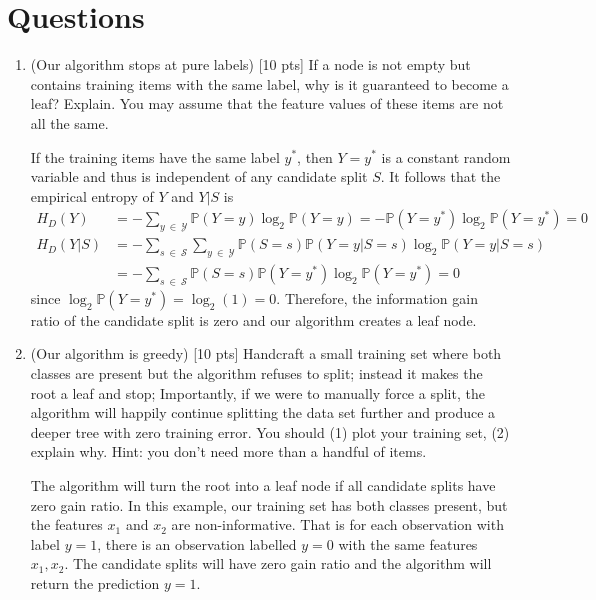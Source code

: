 \documentclass[a4paper]{article}
\theoremstyle{definition}
\newenvironment{soln}{
    \leavevmode\color{blue}\ignorespaces
}{}
\begin{document}
\section{Questions}
\begin{enumerate}
\item (Our algorithm stops at pure labels) [10 pts] If a node is not empty but contains training items with the same label, why is it guaranteed to become a leaf?  Explain. You may assume that the feature values of these items are not all the same. \\

\begin{soln}
  If the training items have the same label $y^*$, then $Y = y^*$ is a constant random variable and thus is independent of any candidate split $S$. It follows that the empirical entropy of $Y$ and $Y|S$ is 
  $$\begin{aligned}
  H_D(Y) &= -\sum_{y \:\in\: \mathcal{Y}}\mathbb{P}(Y=y)\log_2\mathbb{P}(Y=y) = -\mathbb{P}(Y = y^*)\log_2\mathbb{P}(Y=y^*)=0 \\[1ex]
  H_D(Y|S) &= -\sum_{s\:\in\:\mathcal{S}} \sum_{y \:\in\:\mathcal{Y}} \mathbb{P}(S=s)\mathbb{P}(Y=y|S=s)\log_2\mathbb{P}(Y=y|S=s)\\[1ex]
  &=-\sum_{s\:\in\:\mathcal{S}}\mathbb{P}(S=s)\mathbb{P}(Y=y^*)\log_2\mathbb{P}(Y=y^*) = 0
  \end{aligned}$$ since $\log_2\mathbb{P}(Y=y^*)=\log_2(1)=0$. Therefore, the information gain ratio of the candidate split is zero and our algorithm creates a leaf node.
\end{soln}

\item (Our algorithm is greedy)  [10 pts] Handcraft a small training set where both classes are present but the algorithm refuses to split; instead it makes the root a leaf and stop;
Importantly, if we were to manually force a split, the algorithm will happily continue splitting the data set further and produce a deeper tree with zero training error.
You should (1) plot your training set, (2) explain why.  Hint: you don't need more than a handful of items. \\

\begin{soln}
  The algorithm will turn the root into a leaf node if all candidate splits have zero gain ratio. In this example, our training set has both classes present, but the features $x_1$ and $x_2$ are non-informative. That is for each observation with label $y = 1$, there is an observation labelled $y = 0$ with the same features $x_1, x_2$. The candidate splits will have zero gain ratio and the algorithm will return the prediction $y=1$.
\end{soln}


\end{enumerate}
\end{document}
